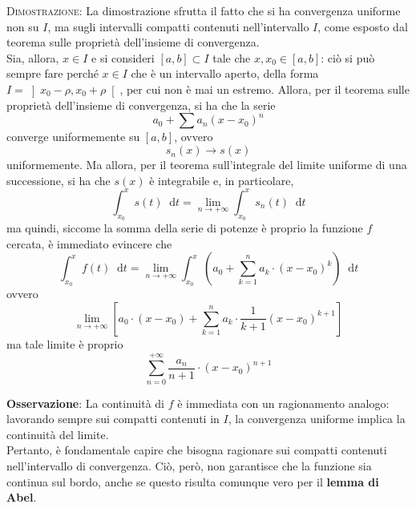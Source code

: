 \documentclass[a4paper]{extarticle}
\newcommand*\dif{\mathop{}\!\mathrm{d}}
\begin{document}
\vspace{2em}
\noindent
\normalfont \normalsize
\textsc{Dimostrazione}: La dimostrazione sfrutta il fatto che si ha convergenza uniforme non su $I$, ma sugli intervalli compatti contenuti nell'intervallo $I$, come esposto dal teorema sulle proprietà dell'insieme di convergenza.\\
Sia, allora, $x \in I$ e si consideri $[a,b] \subset I$ tale che $x,x_0 \in [a,b]$: ciò si può sempre fare perché $x \in I$ che è un intervallo aperto, della forma $I = \left]x_0-\rho,x_0+\rho\right[$, per cui non è mai un estremo. Allora, per il teorema sulle proprietà dell'insieme di convergenza, si ha che la serie
\[a_0+ \sum a_n (x-x_0)^n\]
converge uniformemente su $[a,b]$, ovvero
\[s_n(x) \to s(x)\]
uniformemente. Ma allora, per il teorema sull'integrale del limite uniforme di una successione, si ha che $s(x)$ è integrabile e, in particolare,
\[\int_{x_0}^x s(t) \dif t = \lim_{n \to +\infty} \int_{x_0}^x s_n(t) \dif t\]
ma quindi, siccome la somma della serie di potenze è proprio la funzione $f$ cercata, è immediato evincere che
\[\int_{x_0}^x f(t) \dif t = \lim_{n \to +\infty} \int_{x_0}^x \left(a_0 + \sum_{k=1}^n a_k \cdot (x-x_0)^k\right) \dif t\]
ovvero
\[\lim_{n \to +\infty} \left[a_0 \cdot (x-x_0) + \sum_{k=1}^n a_k \cdot \frac{1}{k+1} (x-x_0)^{k+1}\right]\]
ma tale limite è proprio
\[\sum_{n=0}^{+\infty} \dfrac{a_n}{n+1} \cdot (x-x_0)^{n+1}\]

\vspace{1em}
\noindent
\textbf{Osservazione}: La continuità di $f$ è immediata con un ragionamento analogo: lavorando sempre sui compatti contenuti in $I$, la convergenza uniforme implica la continuità del limite.\\
Pertanto, è fondamentale capire che bisogna ragionare sui compatti contenuti nell'intervallo di convergenza. Ciò, però, non garantisce che la funzione sia continua sul bordo, anche se questo risulta comunque vero per il \textbf{lemma di Abel}.

\vspace{1em}
\end{document}
